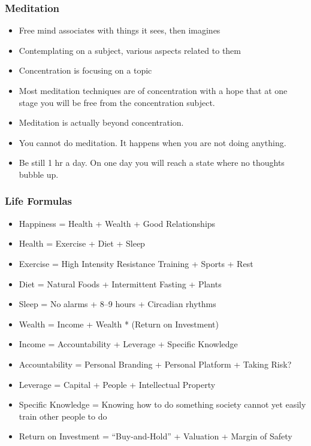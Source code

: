 \begin{frame}[fragile]\frametitle{Meditation}

	\begin{itemize}

	\item Free mind associates with things it sees, then imagines
	\item Contemplating on a subject, various aspects related to them
	\item Concentration is focusing on a topic
	\item Most meditation techniques are of concentration with a hope that at one stage you will be free from the concentration subject. 
	\item Meditation is actually beyond concentration. 
	\item You cannot do meditation. It happens when you are not doing anything. 
	\item Be still 1 hr a day. On one day you will reach a state where no thoughts bubble up.
	\end{itemize}

\end{frame}

\begin{frame}[fragile]\frametitle{Life Formulas}

	\begin{itemize}

	\item Happiness = Health + Wealth + Good Relationships 
\item Health = Exercise + Diet + Sleep 
\item Exercise = High Intensity Resistance Training + Sports + Rest 
\item Diet = Natural Foods + Intermittent Fasting + Plants 
\item Sleep = No alarms + 8–9 hours + Circadian rhythms 
\item Wealth = Income + Wealth * (Return on Investment) 
\item Income = Accountability + Leverage + Specific Knowledge 
\item Accountability = Personal Branding + Personal Platform + Taking Risk? 
\item Leverage = Capital + People + Intellectual Property 
\item Specific Knowledge = Knowing how to do something society cannot yet easily train other people to do 
\item Return on Investment = ``Buy-and-Hold'' + Valuation + Margin of Safety
	\end{itemize}

\end{frame}


